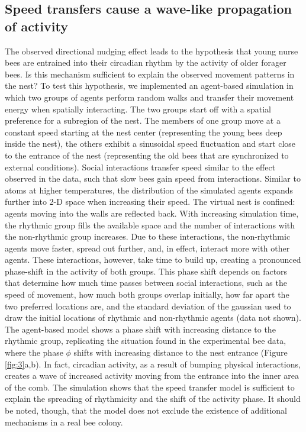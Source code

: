 \documentclass{article}
\begin{document}
\subsection{Speed transfers cause a wave-like propagation of activity}
The observed directional nudging effect leads to the hypothesis that young nurse bees are entrained into their circadian rhythm by the activity of older forager bees. Is this mechanism sufficient to explain the observed movement patterns in the nest? To test this hypothesis, we implemented an agent-based simulation in which two groups of agents perform random walks and transfer their movement energy when spatially interacting. The two groups start off with a spatial preference for a subregion of the nest. The members of one group move at a constant speed starting at the nest center (representing the young bees deep inside the nest), the others exhibit a sinusoidal speed fluctuation and start close to the entrance of the nest (representing the old bees that are synchronized to external conditions). Social interactions transfer speed similar to the effect observed in the data, such that slow bees gain speed from interactions. Similar to atoms at higher temperatures, the distribution of the simulated agents expands further into 2-D space when increasing their speed. The virtual nest is confined: agents moving into the walls are reflected back. With increasing simulation time, the rhythmic group fills the available space and the number of interactions with the non-rhythmic group increases. Due to these interactions, the non-rhythmic agents move faster, spread out further, and, in effect, interact more with other agents. These interactions, however, take time to build up, creating a pronounced phase-shift in the activity of both groups. This phase shift depends on factors that determine how much time passes between social interactions, such as the speed of movement, how much both groups overlap initially, how far apart the two preferred locations are, and the standard deviation of the gaussian used to draw the initial locations of rhythmic and non-rhythmic agents (data not shown). The agent-based model shows a phase shift with increasing distance to the rhythmic group, replicating the situation found in the experimental bee data, where the phase $\phi$ shifts with increasing distance to the nest entrance (Figure \ref{fig:3}a,b). In fact, circadian activity, as a result of bumping physical interactions, creates a wave of increased activity moving from the entrance into the inner area of the comb. The simulation shows that the speed transfer model is sufficient to explain the spreading of rhythmicity and the shift of the activity phase. It should be noted, though, that the model does not exclude the existence of additional mechanisms in a real bee colony. 
\end{document}
